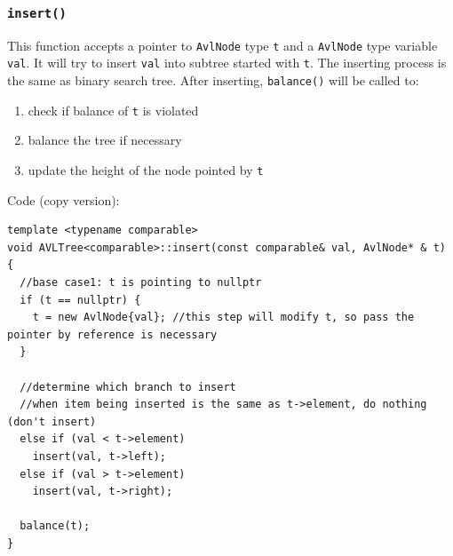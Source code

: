 \documentclass[12pt]{book}
\begin{document}
\subsubsection{\texttt{insert()}}
\label{sec:org5a64759}
This function accepts a pointer to \texttt{AvlNode} type \texttt{t} and a \texttt{AvlNode} type variable \texttt{val}. It will try to insert \texttt{val} into subtree started with \texttt{t}. The inserting process is the same as binary search tree. After inserting, \texttt{balance()} will be called to:
\begin{enumerate}
\item check if balance of \texttt{t} is violated
\item balance the tree if necessary
\item update the height of the node pointed by \texttt{t}
\end{enumerate}

Code (copy version):
\begin{verbatim}
template <typename comparable>
void AVLTree<comparable>::insert(const comparable& val, AvlNode* & t) {  
  //base case1: t is pointing to nullptr
  if (t == nullptr) {
    t = new AvlNode{val}; //this step will modify t, so pass the pointer by reference is necessary
  }

  //determine which branch to insert 
  //when item being inserted is the same as t->element, do nothing (don't insert)
  else if (val < t->element)
    insert(val, t->left);
  else if (val > t->element)
    insert(val, t->right);

  balance(t);
}
\end{verbatim}
\end{document}
